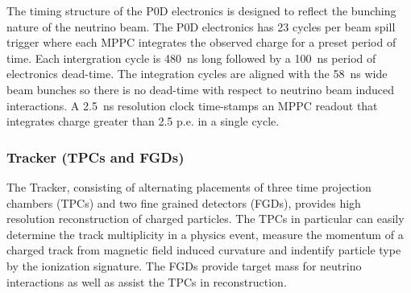 The timing structure of the P0D electronics is designed to reflect the
bunching nature of the neutrino beam. The P0D electronics has 23
cycles per beam spill trigger where each MPPC integrates the observed
charge for a preset period of time. Each intergration cycle is
480~ns long followed by a 100~ns period of electronics dead-time. The
integration cycles are aligned with the 58~ns wide beam bunches so there is no
dead-time with respect to neutrino beam induced interactions. A 2.5~ns
resolution clock time-stamps an MPPC readout that integrates charge
greater than 2.5 p.e. in a single cycle. 


\subsubsection{Tracker (TPCs and FGDs)}

The Tracker, consisting of alternating placements of three time projection chambers (TPCs) and
two fine grained detectors (FGDs), provides high resolution
reconstruction of charged particles. The TPCs in particular can easily
determine the track multiplicity in a physics event, measure the
momentum of a charged track from magnetic field induced curvature and
indentify particle type by the ionization signature. The FGDs
provide target mass for neutrino interactions as well as assist the
TPCs in reconstruction. 

